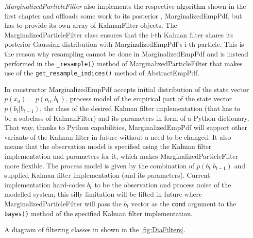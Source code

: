 \emph{MarginalizedParticleFilter} also implements the respective algorithm shown in the first
chapter and offloads some work to its posterior {\pdf}, MarginalizedEmpPdf, but has to provide its
own array of KalmanFilter objects. The MarginalizedParticleFilter class ensures that the i-th Kalman
filter shares its posterior Gaussian distribution with MarginalizedEmpPdf's i-th particle. This is
the reason why resampling cannot be done in MarginalizedEmpPdf and is instead performed in the
\verb|_resample()| method of MarginalizedParticleFilter that makes use of the
\verb|get_resample_indices()| method of AbstractEmpPdf.

In constructor MarginalizedEmpPdf accepts initial distribution of the state vector
\(p(x_0) = p(a_0, b_0)\), process model of the empirical part of the state vector \(p(b_t|b_{t-1})\),
the class of the desired Kalman filter implementation (that has to be a subclass of KalmanFilter)
and its parameters in form of a Python dictionary. That way, thanks to Python capabilities,
MarginalizedEmpPdf will support other variants of the Kalman filter in future without a need to be
changed. It also means that the observation model is specified using the Kalman filter implementation
and parameters for it, which makes MarginalizedParticleFilter more flexible. The process model is
given by the combination of \(p(b_t|b_{t-1})\) and supplied Kalman filter implementation (and its
parameters). Current implementation hard-codes \(b_t\) to be the observation and process noise of
the modelled system; this silly limitation will be lifted in future where MarginalizedParticleFilter
will pass the \(b_t\) vector as the \verb|cond| argument to the \verb|bayes()| method of the
specified Kalman filter implementation.

A diagram of filtering classes in shown in the \autoref{fig:DiaFilters}.

